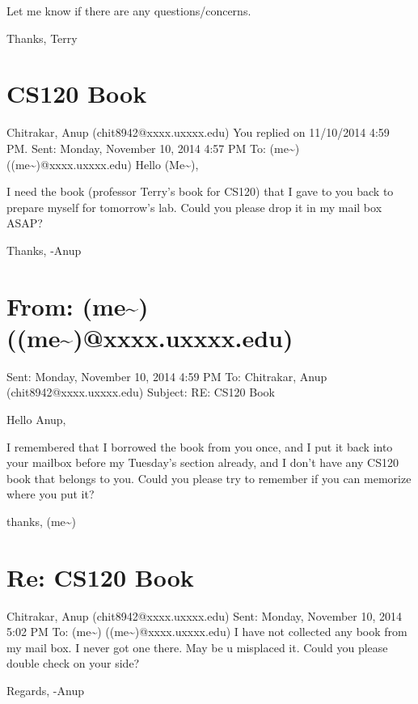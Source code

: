 \documentclass[12pt]{book}
\begin{document}
Let me know if there are any questions/concerns.

Thanks,
Terry


\section{CS120 Book}
\label{sec-25-2}
Chitrakar, Anup (chit8942@xxxx.uxxxx.edu)
You replied on 11/10/2014 4:59 PM.
Sent:        Monday, November 10, 2014 4:57 PM
To:        
(me\textasciitilde{}) ((me\textasciitilde{})@xxxx.uxxxx.edu)
Hello (Me\textasciitilde{}),

I need the book (professor Terry's book for CS120) that I gave to you back to prepare myself for tomorrow's lab. Could you please drop it in my mail box ASAP?

Thanks,
-Anup
\section{From: (me\textasciitilde{}) ((me\textasciitilde{})@xxxx.uxxxx.edu)}
\label{sec-25-3}
Sent: Monday, November 10, 2014 4:59 PM
To: Chitrakar, Anup (chit8942@xxxx.uxxxx.edu)
Subject: RE: CS120 Book

Hello Anup,

I remembered that I borrowed the book from you once, and I put it back into your mailbox before my Tuesday's section already, and I don't have any CS120 book that belongs to you. Could you please try to remember if you can memorize where you put it?

thanks,
(me\textasciitilde{})
\section{Re: CS120 Book}
\label{sec-25-4}
Chitrakar, Anup (chit8942@xxxx.uxxxx.edu)
Sent:        Monday, November 10, 2014 5:02 PM
To:        
(me\textasciitilde{}) ((me\textasciitilde{})@xxxx.uxxxx.edu)
I have not collected any book from my mail box. I never got one there. May be u misplaced it. Could you please double check on your side?

Regards,
-Anup
\end{document}
